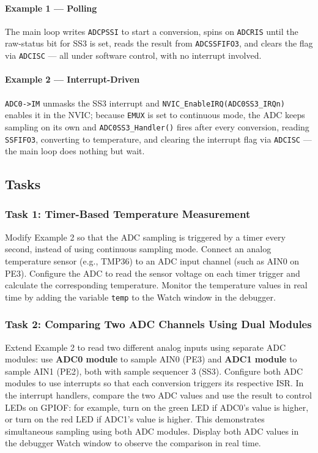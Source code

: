 \paragraph{Example 1 — Polling} The main loop writes \texttt{ADCPSSI} to start a conversion, spins on \texttt{ADCRIS} until the raw-status bit for SS3 is set, reads the result from \texttt{ADCSSFIFO3}, and clears the flag via \texttt{ADCISC} — all under software control, with no interrupt involved.

\paragraph{Example 2 — Interrupt-Driven} \texttt{ADC0->IM} unmasks the SS3 interrupt and \texttt{NVIC\_EnableIRQ(ADC0SS3\_IRQn)} enables it in the NVIC; because \texttt{EMUX} is set to continuous mode, the ADC keeps sampling on its own and \texttt{ADC0SS3\_Handler()} fires after every conversion, reading \texttt{SSFIFO3}, converting to temperature, and clearing the interrupt flag via \texttt{ADCISC} — the main loop does nothing but wait.

\newpage
\subsection{Tasks}

\subsubsection{Task 1: Timer-Based Temperature Measurement}
Modify Example 2 so that the ADC sampling is triggered by a timer every second, instead of using continuous sampling mode. Connect an analog temperature sensor (e.g., TMP36) to an ADC input channel (such as AIN0 on PE3). Configure the ADC to read the sensor voltage on each timer trigger and calculate the corresponding temperature. Monitor the temperature values in real time by adding the variable \texttt{temp} to the Watch window in the debugger.

\subsubsection{Task 2: Comparing Two ADC Channels Using Dual Modules}
Extend Example 2 to read two different analog inputs using separate ADC modules: use \textbf{ADC0 module} to sample AIN0 (PE3) and \textbf{ADC1 module} to sample AIN1 (PE2), both with sample sequencer 3 (SS3). Configure both ADC modules to use interrupts so that each conversion triggers its respective ISR. In the interrupt handlers, compare the two ADC values and use the result to control LEDs on GPIOF: for example, turn on the green LED if ADC0's value is higher, or turn on the red LED if ADC1's value is higher. This demonstrates simultaneous sampling using both ADC modules. Display both ADC values in the debugger Watch window to observe the comparison in real time.